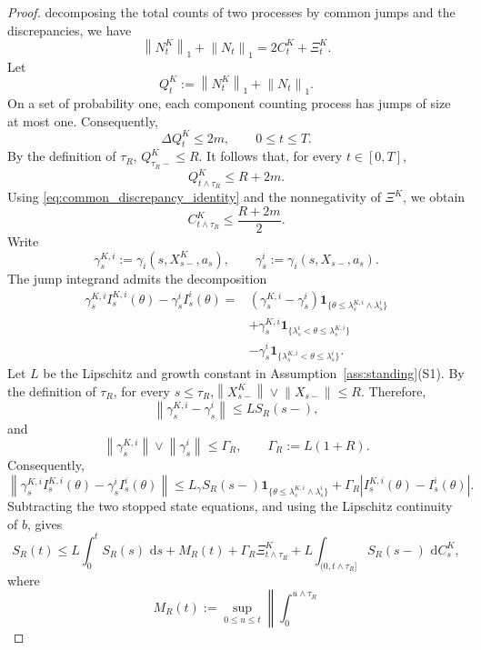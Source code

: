 \documentclass[10pt,a4paper]{amsart}
\newcommand{\dd}{\,\mathrm d}
\newcommand{\norm}[1]{\left\lVert #1 \right\rVert}
\begin{document}
\begin{proof}
decomposing the total counts of two processes by common jumps and the discrepancies, we have
\begin{equation}
\label{eq:common_discrepancy_identity}
\norm{N_t^K}_1+\norm{N_t}_1
=
2C_t^K+\Xi_t^K.
\end{equation} Let
\[
    Q_t^K:=\norm{N_t^K}_1+\norm{N_t}_1.
\]
On a set of probability one, each component counting process has
jumps of size at most one. Consequently,
\[
    \Delta Q_t^K\leq 2m,
    \qquad 0\leq t\leq T.
\]
By the definition of $\tau_R$, $Q_{\tau_R-}^K\leq R$.
It follows that, for every $t\in[0,T]$,
\[
    Q_{t\wedge\tau_R}^K\leq R+2m.
\]
Using \eqref{eq:common_discrepancy_identity} and the nonnegativity of
$\Xi^K$, we obtain
\begin{equation}
\label{eq:stopped_common_count_bound}
C_{t\wedge\tau_R}^K
\leq
\frac{R+2m}{2}.
\end{equation} Write
\[
\gamma_s^{K,i}
:=
\gamma_i(s,X_{s-}^K,a_s),
\qquad
\gamma_s^i
:=
\gamma_i(s,X_{s-},a_s).
\]
The jump integrand admits the decomposition
\[
\begin{aligned}
\gamma_s^{K,i}I_s^{K,i}(\theta)
-
\gamma_s^iI_s^i(\theta)
={}&
\left(
    \gamma_s^{K,i}-\gamma_s^i
\right)
\mathbf 1_{\{
    \theta\leq
    \lambda_s^{K,i}\wedge\lambda_s^i
\}}
\\
&+
\gamma_s^{K,i}
\mathbf 1_{\{
    \lambda_s^i<\theta\leq\lambda_s^{K,i}
\}}
\\
&-
\gamma_s^i
\mathbf 1_{\{
    \lambda_s^{K,i}<\theta\leq\lambda_s^i
\}}.
\end{aligned}
\] Let $L$ be the Lipschitz and growth constant in
Assumption~\ref{ass:standing}(S1). By the definition of
$\tau_R$, for every $s\leq\tau_R$,$\norm{X_{s-}^K}\vee\norm{X_{s-}}\leq R$.
Therefore,
\[
\norm{\gamma_s^{K,i}-\gamma_s^i}
\leq
L S_R(s-),
\]
and
\[
\norm{\gamma_s^{K,i}}
\vee
\norm{\gamma_s^i}
\leq
\Gamma_R,
\qquad
\Gamma_R:=L(1+R).
\]
Consequently,
\[
\norm{
\gamma_s^{K,i}I_s^{K,i}(\theta)
-
\gamma_s^iI_s^i(\theta)
}\leq
L_\gamma S_R(s-)
\mathbf 1_{\{
    \theta\leq
    \lambda_s^{K,i}\wedge\lambda_s^i
\}}
+
\Gamma_R
\left|
    I_s^{K,i}(\theta)-I_s^i(\theta)
\right|.
\] Subtracting the two stopped state equations, and using the Lipschitz
continuity of $b$, gives
\begin{equation}
\label{eq:stopped_state_pathwise}
S_R(t)
\leq{}
L\int_0^tS_R(s)\,\dd s
+
M_R(t)
+
\Gamma_R\Xi_{t\wedge\tau_R}^K+
L
\int_{(0,t\wedge\tau_R]}
S_R(s-)\,\dd C_s^K,
\end{equation}
where
\[
M_R(t)
:=
\sup_{0\leq u\leq t}
\left\|
\int_0^{u\wedge\tau_R}
\]
\end{proof}
\end{document}
